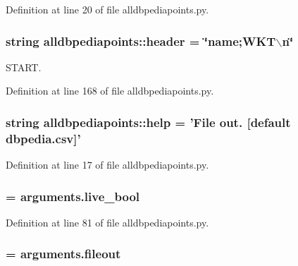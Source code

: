 \-Definition at line 20 of file alldbpediapoints.\-py.

\hypertarget{namespacealldbpediapoints_a4b54f931c46b9fb9da599923641a2faf}{
\subsubsection[{header}]{\setlength{\rightskip}{0pt plus 5cm}string {\bf alldbpediapoints\-::header} = \char`\"{}name;\-W\-K\-T$\backslash$n\char`\"{}}}\label{namespacealldbpediapoints_a4b54f931c46b9fb9da599923641a2faf}


\-S\-T\-A\-R\-T. 



\-Definition at line 168 of file alldbpediapoints.\-py.

\hypertarget{namespacealldbpediapoints_ab3aabe434bef7bdc96533eb4b05d5eae}{
\subsubsection[{help}]{\setlength{\rightskip}{0pt plus 5cm}string {\bf alldbpediapoints\-::help} = '\-File out. \mbox{[}default dbpedia.\-csv\mbox{]}'}}\label{namespacealldbpediapoints_ab3aabe434bef7bdc96533eb4b05d5eae}


\-Definition at line 17 of file alldbpediapoints.\-py.

\hypertarget{namespacealldbpediapoints_a4222234d924a677b768a452ce5dea7e1}{
\subsubsection[{islive}]{ = arguments.\-live\-\_\-bool}}\label{namespacealldbpediapoints_a4222234d924a677b768a452ce5dea7e1}


\-Definition at line 81 of file alldbpediapoints.\-py.

\hypertarget{namespacealldbpediapoints_ab8a03fffea8583884638a93339ff4523}{
\subsubsection[{\-O\-F}]{ = arguments.\-fileout}}\label{namespacealldbpediapoints_ab8a03fffea8583884638a93339ff4523}


